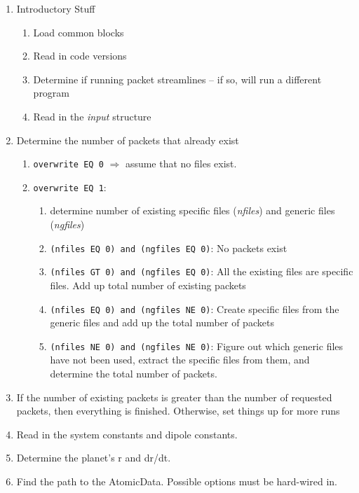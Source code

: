 \documentclass[11pt]{article}
\begin{document}
\begin{enumerate}
\item Introductory Stuff
  \begin{enumerate}
  \item Load common blocks
  \item Read in code versions
  \item Determine if running packet streamlines -- if so, will run a different program
  \item Read in the \textit{input} structure
  \end{enumerate}

\item Determine the number of packets that already exist
  \begin{enumerate}
  \item \texttt{overwrite EQ 0} $\Rightarrow$ assume that no files exist.
  \item \texttt{overwrite EQ 1}:
    \begin{enumerate}
    \item determine number of existing specific files (\textit{nfiles}) and generic files
    (\textit{ngfiles})
    \item \texttt{(nfiles EQ 0) and (ngfiles EQ 0)}: No packets exist
    \item \texttt{(nfiles GT 0) and (ngfiles EQ 0)}: All the existing files are specific
    files. Add up total number of existing packets
    \item \texttt{(nfiles EQ 0) and (ngfiles NE 0)}: Create specific files from the
    generic files and add up the total number of packets
    \item \texttt{(nfiles NE 0) and (ngfiles NE 0)}: Figure out which generic files 
    have not been used, extract the specific files from them, and determine the total
    number of packets.
    \end{enumerate}
  \end{enumerate}

\item If the number of existing packets is greater than the number of requested packets,
then everything is finished. Otherwise, set things up for more runs

\item Read in the system constants and dipole constants.

\item Determine the planet's r and dr/dt.

\item Find the path to the AtomicData. Possible options must be hard-wired in.


\end{enumerate}
\end{document}
